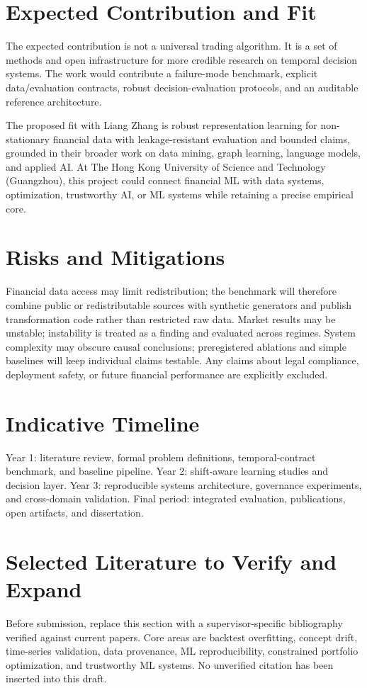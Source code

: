 \documentclass[11pt]{article}
\begin{document}
\section*{Expected Contribution and Fit}
The expected contribution is not a universal trading algorithm. It is a set of methods and open infrastructure for more credible research on temporal decision systems. The work would contribute a failure-mode benchmark, explicit data/evaluation contracts, robust decision-evaluation protocols, and an auditable reference architecture.

The proposed fit with Liang Zhang is robust representation learning for non-stationary financial data with leakage-resistant evaluation and bounded claims, grounded in their broader work on data mining, graph learning, language models, and applied AI. At The Hong Kong University of Science and Technology (Guangzhou), this project could connect financial ML with data systems, optimization, trustworthy AI, or ML systems while retaining a precise empirical core.

\section*{Risks and Mitigations}
Financial data access may limit redistribution; the benchmark will therefore combine public or redistributable sources with synthetic generators and publish transformation code rather than restricted raw data. Market results may be unstable; instability is treated as a finding and evaluated across regimes. System complexity may obscure causal conclusions; preregistered ablations and simple baselines will keep individual claims testable. Any claims about legal compliance, deployment safety, or future financial performance are explicitly excluded.

\section*{Indicative Timeline}
Year 1: literature review, formal problem definitions, temporal-contract benchmark, and baseline pipeline. Year 2: shift-aware learning studies and decision layer. Year 3: reproducible systems architecture, governance experiments, and cross-domain validation. Final period: integrated evaluation, publications, open artifacts, and dissertation.

\section*{Selected Literature to Verify and Expand}
Before submission, replace this section with a supervisor-specific bibliography verified against current papers. Core areas are backtest overfitting, concept drift, time-series validation, data provenance, ML reproducibility, constrained portfolio optimization, and trustworthy ML systems. No unverified citation has been inserted into this draft.
\end{document}
